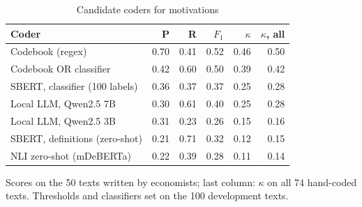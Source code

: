 \begin{table}[htbp]
\centering\small
\caption{Candidate coders for motivations}\label{tab:coders-mot}
\begin{tabular}{@{}lrrrrr@{}}
\toprule
\textbf{Coder} & \textbf{P} & \textbf{R} & $F_1$ & $\kappa$ & $\kappa$\textbf{, all} \\
\midrule
Codebook (regex) & 0.70 & 0.41 & 0.52 & 0.46 & 0.50 \\
Codebook OR classifier & 0.42 & 0.60 & 0.50 & 0.39 & 0.42 \\
SBERT, classifier (100 labels) & 0.36 & 0.37 & 0.37 & 0.25 & 0.28 \\
Local LLM, Qwen2.5 7B & 0.30 & 0.61 & 0.40 & 0.25 & 0.28 \\
Local LLM, Qwen2.5 3B & 0.31 & 0.23 & 0.26 & 0.15 & 0.16 \\
SBERT, definitions (zero-shot) & 0.21 & 0.71 & 0.32 & 0.12 & 0.15 \\
NLI zero-shot (mDeBERTa) & 0.22 & 0.39 & 0.28 & 0.11 & 0.14 \\
\bottomrule
\end{tabular}
\par\smallskip\parbox{0.92\linewidth}{\footnotesize Scores on the 50 texts written by economists; last column: $\kappa$ on all 74 hand-coded texts. Thresholds and classifiers set on the 100 development texts.}
\end{table}
